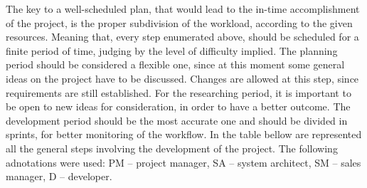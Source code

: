 The key to a well-scheduled plan, that would lead to the in-time accomplishment of the project, is the proper subdivision of the workload, according to the given resources. Meaning that, every step enumerated above, should be scheduled for a finite period of time, judging by the level of difficulty implied. The planning period should be considered a flexible one, since at this moment some general ideas on the project have to be discussed. Changes are allowed at this step, since requirements are still established. For the researching period, it is important to be open to new ideas for consideration, in order to have a better outcome. The development period should be the most accurate one and should be divided in sprints, for better monitoring of the workflow. In the table bellow are represented all the general steps involving the development of the project. The following adnotations were used: PM –
project manager, SA – system architect, SM – sales manager, D – developer.


\begin{table}[H]
\centering
\caption{Time schedule}
\label{table:schedule}
\end{table}
 
